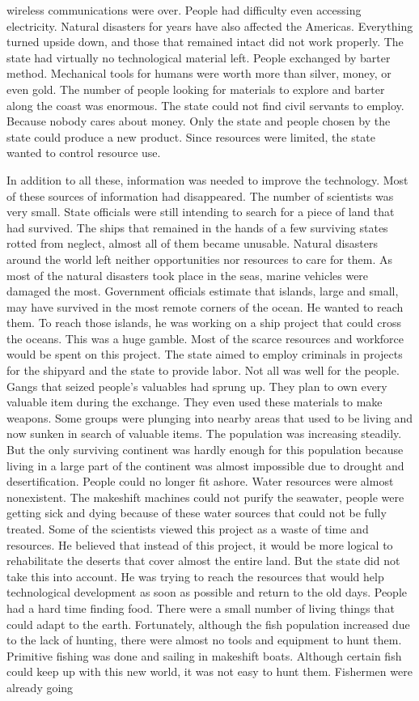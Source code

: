 \documentclass[]{book}
\begin{document}
wireless communications were over. People had difficulty even accessing electricity. Natural disasters for years have also affected the Americas. Everything turned upside down, and those that remained intact did not work properly. The state had virtually no technological material left. People exchanged by barter method. Mechanical tools for humans were worth more than silver, money, or even gold. The number of people looking for materials to explore and barter along the coast was enormous. The state could not find civil servants to employ. Because nobody cares about money. Only the state and people chosen by the state could produce a new product. Since resources were limited, the state wanted to control resource use.

In addition to all these, information was needed to improve the technology. Most of these sources of information had disappeared. The number of scientists was very small. State officials were still intending to search for a piece of land that had survived. The ships that remained in the hands of a few surviving states rotted from neglect, almost all of them became unusable. Natural disasters around the world left neither opportunities nor resources to care for them. As most of the natural disasters took place in the seas, marine vehicles were damaged the most. Government officials estimate that islands, large and small, may have survived in the most remote corners of the ocean. He wanted to reach them. To reach those islands, he was working on a ship project that could cross the oceans. This was a huge gamble. Most of the scarce resources and workforce would be spent on this project. The state aimed to employ criminals in projects for the shipyard and the state to provide labor. Not all was well for the people. Gangs that seized people's valuables had sprung up. They plan to own every valuable item during the exchange. They even used these materials to make weapons. Some groups were plunging into nearby areas that used to be living and now sunken in search of valuable items. The population was increasing steadily. But the only surviving continent was hardly enough for this population because living in a large part of the continent was almost impossible due to drought and desertification. People could no longer fit ashore. Water resources were almost nonexistent. The makeshift machines could not purify the seawater, people were getting sick and dying because of these water sources that could not be fully treated. Some of the scientists viewed this project as a waste of time and resources. He believed that instead of this project, it would be more logical to rehabilitate the deserts that cover almost the entire land. But the state did not take this into account. He was trying to reach the resources that would help technological development as soon as possible and return to the old days. People had a hard time finding food. There were a small number of living things that could adapt to the earth. Fortunately, although the fish population increased due to the lack of hunting, there were almost no tools and equipment to hunt them. Primitive fishing was done and sailing in makeshift boats. Although certain fish could keep up with this new world, it was not easy to hunt them. Fishermen were already going 
\end{document}
